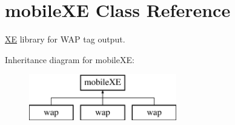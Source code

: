\hypertarget{classmobileXE}{}\section{mobile\+XE Class Reference}
\label{classmobileXE}


\hyperlink{namespaceXE}{XE} library for W\+AP tag output.  


Inheritance diagram for mobile\+XE\+:\begin{figure}[H]
\begin{center}
\leavevmode
\includegraphics[height=2.000000cm]{classmobileXE}
\end{center}
\end{figure}

